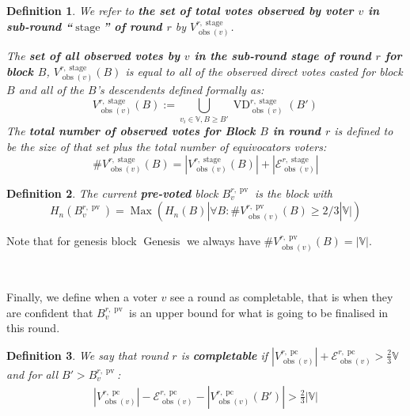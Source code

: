 \documentclass{article}
\newcommand{\assign}{:=}
\newcommand{\nosymbol}{}
\newcommand{\tmop}[1]{\ensuremath{\operatorname{#1}}}
\newcommand{\tmstrong}[1]{\textbf{#1}}
\newcommand{\tmtextbf}[1]{{\bfseries{#1}}}
\newtheorem{definition}{Definition}
\providecommand{\nosymbol}{}
\providecommand{\tmop}[1]{\ensuremath{\mathrm{#1}}}
\providecommand{\tmstrong}[1]{\tmtextbf{#1}}
\providecommand{\tmtextbf}[1]{\tmtextbf{#1}}
\newtheorem{definition}{Definition}
\begin{document}
\begin{definition}
  We refer to {\tmstrong{the set of total votes observed by voter $v$ in
  sub-round ``$\tmop{stage}$'' of round $r$}} by {\tmstrong{$V^{r,
  \tmop{stage}}_{\tmop{obs} (v)}^{\nosymbol}_{\nosymbol}$}}.
  
  The {\tmstrong{set of all observed votes by $v$ in the sub-round stage of
  round $r$ for block $B$}}, {\tmstrong{$V^{r, \tmop{stage}}_{\tmop{obs} (v)}
  (B)$}} is equal to all of the observed direct votes casted for block $B$ and
  all of the $B$'s descendents defined formally as:
  \[ V^{r, \tmop{stage}}_{\tmop{obs} (v)} (B) \assign \bigcup_{v_i \in
     \mathbb{V}, B \geqslant B'} \tmop{VD}^{r, \tmop{stage}}_{\tmop{obs} (v)}
     (B')_{\nosymbol}^{\nosymbol}_{\nosymbol} \]
  The {\tmstrong{total number of observed votes for Block $B$ in round $r$}}
  is defined to be the size of that set plus the total number of equivocators
  voters:
  \[ \#V^{r, \tmop{stage}}_{\tmop{obs} (v)} (B) = |V^{r,
     \tmop{stage}}_{\tmop{obs} (v)} (B) | + | \mathcal{E}^{r,
     \tmop{stage}}_{\tmop{obs} (v)} | \]
\end{definition}

\begin{definition}
  The current {\tmstrong{pre-voted}} block $B^{r, \tmop{pv}}_v$ is the block
  with
  \[ H_n (B^{r, \tmop{pv}}_v) = \tmop{Max} (H_n (B) | \forall B :
     \#V_{\tmop{obs} (v)}^{r, \tmop{pv}} (B) \geqslant 2 / 3|\mathbb{V}|) \]
\end{definition}

Note that for genesis block $\tmop{Genesis}$ we always have $\#V_{\tmop{obs}
(v)}^{r, \tmop{pv}} (B) = | \mathbb{V} |$.

\

Finally, we define when a voter $v$ see a round as completable, that is when
they are confident that $B_v^{r, \tmop{pv}}$ is an upper bound for what is
going to be finalised in this round. \

\begin{definition}
  \label{defn-grandpa-completable}We say that round $r$ is
  {\tmstrong{completable}} if $|V^{r, \tmop{pc}}_{\tmop{obs} (v)} |
  +\mathcal{E}^{r, \tmop{pc}}_{\tmop{obs} (v)} > \frac{2}{3} \mathbb{V}$ and
  for all $B' > B_v^{r, \tmop{pv}}$:
  \[ \begin{array}{l}
       |V^{r, \tmop{pc}}_{\tmop{obs} (v)} | -\mathcal{E}^{r,
       \tmop{pc}}_{\tmop{obs} (v)} - |V^{r, \tmop{pc}}_{\tmop{obs}
       (v)_{\nosymbol}} (B') | > \frac{2}{3} |\mathbb{V}|
     \end{array} \]
\end{definition}
\end{document}
